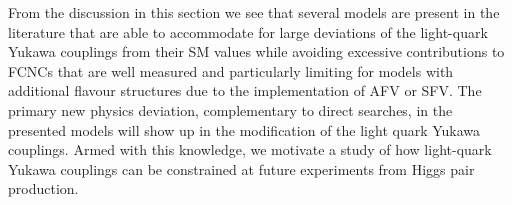 

From the discussion in this section we see that several models are present in the literature that are able to accommodate for large deviations of the light-quark Yukawa couplings from their SM values while avoiding excessive contributions to FCNCs that are well measured and particularly limiting for models with additional flavour structures due to the implementation of AFV or SFV. The primary new physics deviation, complementary to direct searches, in the presented models will show up in the modification of the light quark Yukawa couplings. Armed with this knowledge, we motivate a study of how light-quark Yukawa couplings can be constrained at future experiments from Higgs pair production.


